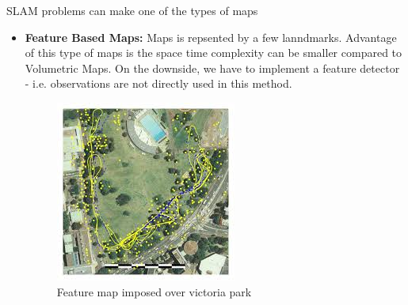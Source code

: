 \documentclass{article}
\begin{document}
SLAM problems can make one of the types of maps
\begin{itemize}
    \item \textbf{Feature Based Maps:} Maps is repsented by a few lanndmarks. Advantage of this type of maps is the space time complexity can be smaller compared to Volumetric Maps. On the downside, we have to implement a feature detector - i.e. observations are not directly used in this method. 
        \begin{figure}
            
            \includegraphics[width = \linewidth]{./feature_maps.jpeg}
            \caption{Feature map imposed over victoria park}
        \end{figure}


\end{itemize}
\end{document}
